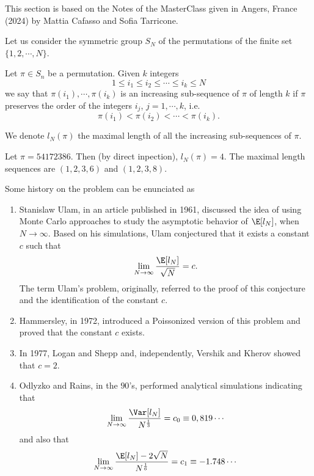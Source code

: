 
This section is based on the Notes of the MasterClass given in Angers, France (2024) by Mattia Cafasso and Sofia Tarricone.

Let us consider the symmetric group $S_N$ of the permutations of the finite set $\{1, 2, \cdots, N\}$.
\begin{definition}
	Let $\pi \in S_n$ be a permutation. Given $k$ integers
	\begin{equation}
		1 \leq i_1 \leq i_2 \leq \cdots \leq i_k \leq N
	\end{equation}
	we say that $\pi(i_1), \cdots, \pi(i_k)$ is an increasing sub-sequence of $\pi$ of length $k$ if $\pi$ preserves the order of the integers $i_j$, $j = 1, \cdots, k$, i.e.
	\begin{equation}
		\pi(i_1) < \pi(i_2) < \cdots < \pi(i_k).
	\end{equation}
\end{definition}
We denote $l_N(\pi)$ the maximal length of all the increasing sub-sequences of $\pi$.

\begin{ex}
	Let $\pi = 54172386$. Then (by direct inpection), $l_N(\pi) = 4$. The maximal length sequences are $(1, 2, 3, 6)$ and $(1, 2, 3, 8)$.
\end{ex}

Some history on the problem can be enunciated as

\begin{enumerate}
	\item Stanislaw Ulam, in an article published in 1961, discussed the idea of using Monte Carlo approaches to study the asymptotic behavior of $\E[l_N]$, when $N \rightarrow \infty$. Based on his simulations, Ulam conjectured that it exists a constant $c$ such that $$\lim_{N \rightarrow \infty} \frac{\E[l_N]}{\sqrt{N}} = c.$$ The term Ulam's problem, originally, referred to the proof of this conjecture and the identification of the constant $c$. 
	\item Hammersley, in 1972, introduced a Poissonized version of this problem and proved that the constant $c$ exists. 
	\item In 1977, Logan and Shepp and, independently, Vershik and Kherov showed that $c = 2$. 
	\item Odlyzko and Rains, in the $90$'s, performed analytical simulations indicating that 
	\[
	\lim_{N \rightarrow \infty} \frac{\Var[l_N]}{N^{\frac{1}{3}}} = c_0 \equiv 0,819\cdots
	\]
	and also that
	\[
	\lim_{N \rightarrow \infty} \frac{\E[l_N] - 2\sqrt{N}}{N^{\frac{1}{6}}} = c_1 \equiv -1.748\cdots
	\]
\end{enumerate}

